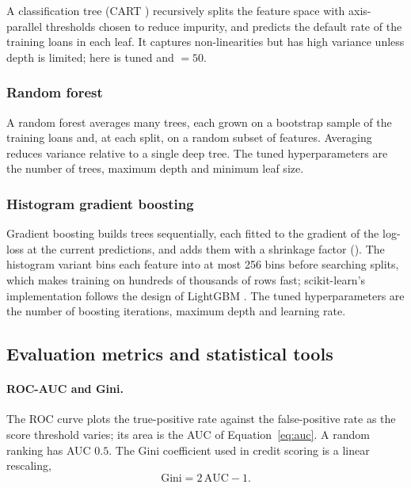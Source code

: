 A classification tree (CART \cite{breiman1984}) recursively splits the feature space with axis-parallel thresholds chosen to reduce impurity, and predicts the default rate of the training loans in each leaf. It captures non-linearities but has high variance unless depth is limited; here  is tuned and $=50$.

\subsubsection{Random forest}

A random forest \cite{breiman2001} averages many trees, each grown on a bootstrap sample of the training loans and, at each split, on a random subset of features. Averaging reduces variance relative to a single deep tree. The tuned hyperparameters are the number of trees, maximum depth and minimum leaf size.

\subsubsection{Histogram gradient boosting}

Gradient boosting \cite{friedman2001} builds trees sequentially, each fitted to the gradient of the log-loss at the current predictions, and adds them with a shrinkage factor (). The histogram variant bins each feature into at most 256 bins before searching splits, which makes training on hundreds of thousands of rows fast; scikit-learn's implementation follows the design of LightGBM \cite{ke2017,pedregosa2011}. The tuned hyperparameters are the number of boosting iterations, maximum depth and learning rate.

\subsection{Evaluation metrics and statistical tools}
\label{sec:metric-theory}

\paragraph{ROC-AUC and Gini.} The ROC curve plots the true-positive rate against the false-positive rate as the score threshold varies; its area is the AUC of Equation~\eqref{eq:auc}. A random ranking has AUC $0.5$. The Gini coefficient used in credit scoring is a linear rescaling,
\begin{equation}
\mathrm{Gini}=2\,\mathrm{AUC}-1.
\end{equation}

